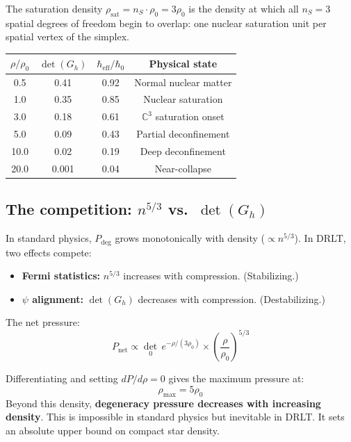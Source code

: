 \documentclass[12pt]{article}
\theoremstyle{definition}
\theoremstyle{remark}
\begin{document}
The saturation density $\rho_\text{sat} = n_S \cdot \rho_0 = 3\rho_0$ is the density at which all $n_S = 3$ spatial degrees of freedom begin to overlap: one nuclear saturation unit per spatial vertex of the simplex.

\begin{center}
\begin{tabular}{cccc}
\hline
$\rho/\rho_0$ & $\det(G_h)$ & $\hbar_\text{eff}/\hbar_0$ & Physical state \\
\hline
0.5 & 0.41 & 0.92 & Normal nuclear matter \\
1.0 & 0.35 & 0.85 & Nuclear saturation \\
3.0 & 0.18 & 0.61 & $\mathbb{C}^3$ saturation onset \\
5.0 & 0.09 & 0.43 & Partial deconfinement \\
10.0 & 0.02 & 0.19 & Deep deconfinement \\
20.0 & 0.001 & 0.04 & Near-collapse \\
\hline
\end{tabular}
\end{center}

\subsection{The competition: $n^{5/3}$ vs.\ $\det(G_h)$}

In standard physics, $P_\text{deg}$ grows monotonically with density ($\propto n^{5/3}$). In DRLT, two effects compete:
\begin{itemize}
\item \textbf{Fermi statistics:} $n^{5/3}$ increases with compression. (Stabilizing.)
\item \textbf{$\psi$ alignment:} $\det(G_h)$ decreases with compression. (Destabilizing.)
\end{itemize}

The net pressure:
\begin{equation}
P_\text{net} \propto \det_0\,e^{-\rho/(3\rho_0)} \times \left(\frac{\rho}{\rho_0}\right)^{5/3}
\end{equation}

Differentiating and setting $dP/d\rho = 0$ gives the maximum pressure at:
\begin{equation}
\rho_\text{max} = 5\rho_0
\end{equation}
Beyond this density, \textbf{degeneracy pressure decreases with increasing density}. This is impossible in standard physics but inevitable in DRLT. It sets an absolute upper bound on compact star density.
\end{document}
